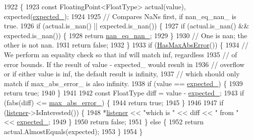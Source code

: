 \begin{DoxyCode}
1922                                                                       \{
1923       \textcolor{keyword}{const} FloatingPoint<FloatType> actual(value), expected(\hyperlink{classtesting_1_1internal_1_1FloatingEqMatcher_1_1Impl_ab7d6c6eed79e4bd83fc3758bb53395eb}{expected\_});
1924 
1925       \textcolor{comment}{// Compares NaNs first, if nan\_eq\_nan\_ is true.}
1926       \textcolor{keywordflow}{if} (actual.is\_nan() || expected.is\_nan()) \{
1927         \textcolor{keywordflow}{if} (actual.is\_nan() && expected.is\_nan()) \{
1928           \textcolor{keywordflow}{return} \hyperlink{classtesting_1_1internal_1_1FloatingEqMatcher_1_1Impl_a77073561281e81e81ac8c870a0689e7a}{nan\_eq\_nan\_};
1929         \}
1930         \textcolor{comment}{// One is nan; the other is not nan.}
1931         \textcolor{keywordflow}{return} \textcolor{keyword}{false};
1932       \}
1933       \textcolor{keywordflow}{if} (\hyperlink{classtesting_1_1internal_1_1FloatingEqMatcher_1_1Impl_a3e3539f59004154b8af47a87a83a2d59}{HasMaxAbsError}()) \{
1934         \textcolor{comment}{// We perform an equality check so that inf will match inf, regardless}
1935         \textcolor{comment}{// of error bounds.  If the result of value - expected\_ would result in}
1936         \textcolor{comment}{// overflow or if either value is inf, the default result is infinity,}
1937         \textcolor{comment}{// which should only match if max\_abs\_error\_ is also infinity.}
1938         \textcolor{keywordflow}{if} (value == \hyperlink{classtesting_1_1internal_1_1FloatingEqMatcher_1_1Impl_ab7d6c6eed79e4bd83fc3758bb53395eb}{expected\_}) \{
1939           \textcolor{keywordflow}{return} \textcolor{keyword}{true};
1940         \}
1941 
1942         \textcolor{keyword}{const} FloatType diff = value - \hyperlink{classtesting_1_1internal_1_1FloatingEqMatcher_1_1Impl_ab7d6c6eed79e4bd83fc3758bb53395eb}{expected\_};
1943         \textcolor{keywordflow}{if} (fabs(diff) <= \hyperlink{classtesting_1_1internal_1_1FloatingEqMatcher_1_1Impl_afec03a9fc571d9907979f088ff5e55e5}{max\_abs\_error\_}) \{
1944           \textcolor{keywordflow}{return} \textcolor{keyword}{true};
1945         \}
1946 
1947         \textcolor{keywordflow}{if} (\hyperlink{namespaceinteractive__marker_a0e579ab555212bb5e2c9f8a675b7618a}{listener}->IsInterested()) \{
1948           *\hyperlink{namespaceinteractive__marker_a0e579ab555212bb5e2c9f8a675b7618a}{listener} << \textcolor{stringliteral}{"which is "} << diff << \textcolor{stringliteral}{" from "} << \hyperlink{classtesting_1_1internal_1_1FloatingEqMatcher_1_1Impl_ab7d6c6eed79e4bd83fc3758bb53395eb}{expected\_};
1949         \}
1950         \textcolor{keywordflow}{return} \textcolor{keyword}{false};
1951       \} \textcolor{keywordflow}{else} \{
1952         \textcolor{keywordflow}{return} actual.AlmostEquals(expected);
1953       \}
1954     \}
\end{DoxyCode}

